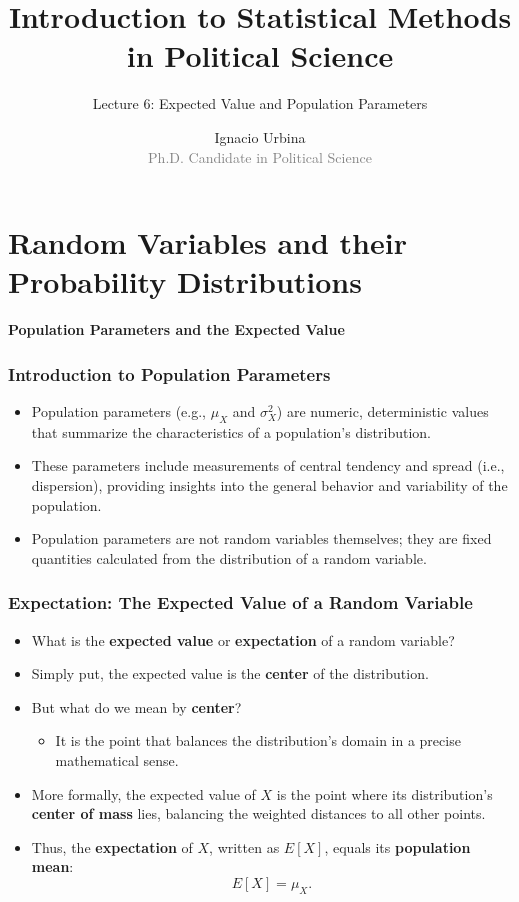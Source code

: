 \documentclass[handout]{beamer} %
\title{Introduction to Statistical Methods in Political Science}
\subtitle{Lecture 6: Expected Value and Population Parameters}
\author{Ignacio Urbina \texorpdfstring{\\ \vspace{0.3em}}{ } \scriptsize \textcolor{gray}{Ph.D. Candidate in Political Science}}
\date{}
\newcommand{\transitionslide}[1]{
    \begin{frame} %
        \centering
        \vspace{1cm}
        \Huge
        \textcolor{moonstoneblue!150}{\textbf{#1}}
    \end{frame}
}
\begin{document}
\frame{\titlepage}

\section{Random Variables and their Probability Distributions}

\transitionslide{Population Parameters and the Expected Value}

\begin{frame} %
\frametitle{Introduction to Population Parameters}

\begin{itemize}
  \item Population parameters (e.g., $\mu_X$ and $\sigma_X^2$) are numeric, deterministic values that summarize the characteristics of a population's distribution.
  \pause
  \item These parameters include measurements of central tendency and spread (i.e., dispersion), providing insights into the general behavior and variability of the population.
  \pause
  \item Population parameters are not random variables themselves; they are fixed quantities calculated from the distribution of a random variable.
\end{itemize}

\end{frame}

\begin{frame} %
\frametitle{Expectation: The Expected Value of a Random Variable}

\begin{itemize}
  \item What is the \textbf{expected value} or \textbf{expectation} of a random variable?
  \pause
  \item Simply put, the expected value is the \textbf{center} of the distribution.
  \pause
  \item But what do we mean by \textbf{center}?
  \pause
  \begin{itemize}
    \item It is the point that balances the distribution’s domain in a precise mathematical sense.
  \end{itemize}
  \pause
  \item More formally, the expected value of $X$ is the point where its distribution’s \textbf{center of mass} lies, balancing the weighted distances to all other points.
  \pause
  \item Thus, the \textbf{expectation} of $X$, written as $E[X]$, equals its \textbf{population mean}:  
    \[
    E[X] = \mu_X.
    \]
\end{itemize}

\end{frame}
\end{document}
